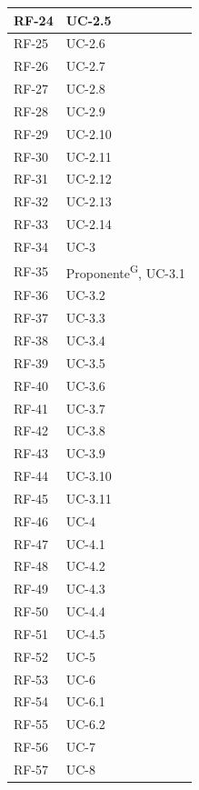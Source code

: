 \documentclass[8pt]{article}
\newcommand{\glossterm}[1]{#1\textsuperscript{G}} %
\begin{document}
\begin{longtable}{|>{\centering\arraybackslash}p{4cm}|>{\centering\arraybackslash}p{4cm}|}
            RF-24 & UC-2.5 \\ \hline
            RF-25 & UC-2.6 \\ \hline
            RF-26 & UC-2.7 \\ \hline
            RF-27 & UC-2.8 \\ \hline
            RF-28 & UC-2.9 \\ \hline
            RF-29 & UC-2.10 \\ \hline
            RF-30 & UC-2.11 \\ \hline
            RF-31 & UC-2.12 \\ \hline
            RF-32 & UC-2.13 \\ \hline
            RF-33 & UC-2.14 \\ \hline
            RF-34 & UC-3 \\ \hline
            RF-35 & \glossterm{Proponente}, UC-3.1 \\ \hline
            RF-36 & UC-3.2 \\ \hline
            RF-37 & UC-3.3 \\ \hline
            RF-38 & UC-3.4 \\ \hline
            RF-39 & UC-3.5 \\ \hline
            RF-40 & UC-3.6 \\ \hline
            RF-41 & UC-3.7 \\ \hline
            RF-42 & UC-3.8 \\ \hline
            RF-43 & UC-3.9 \\ \hline
            RF-44 & UC-3.10 \\ \hline
            RF-45 & UC-3.11 \\ \hline
            RF-46 & UC-4 \\ \hline
            RF-47 & UC-4.1 \\ \hline
            RF-48 & UC-4.2 \\ \hline
            RF-49 & UC-4.3 \\ \hline
            RF-50 & UC-4.4 \\ \hline
            RF-51 & UC-4.5 \\ \hline
            RF-52 & UC-5 \\ \hline
            RF-53 & UC-6 \\ \hline
            RF-54 & UC-6.1 \\ \hline
            RF-55 & UC-6.2 \\ \hline
            RF-56 & UC-7 \\ \hline
            RF-57 & UC-8 \\ \hline

\end{longtable}
\end{document}

